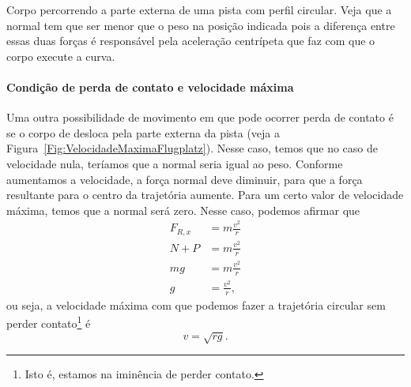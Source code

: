 \begin{marginfigure}
\centering
{}
\caption{Corpo percorrendo a parte externa de uma pista com perfil circular. Veja que a normal tem que ser menor que o peso na posição indicada pois a diferença entre essas duas forças é responsável pela aceleração centrípeta que faz com que o corpo execute a curva.\label{Fig:VelocidadeMaximaFlugplatz}}
\end{marginfigure}

\paragraph{Condição de perda de contato e velocidade máxima}

Uma outra possibilidade de movimento em que pode ocorrer perda de contato é se o corpo de desloca pela parte externa da pista (veja a Figura~\ref{Fig:VelocidadeMaximaFlugplatz}). Nesse caso, temos que no caso de velocidade nula, teríamos que a normal seria igual ao peso. Conforme aumentamos a velocidade, a força normal deve diminuir, para que a força resultante para o centro da trajetória aumente. Para um certo valor de velocidade máxima, temos que a normal será zero. Nesse caso, podemos afirmar que
\begin{align}
    F_{R,x} &= m \frac{v^2}{r} \\
    N + P &= m \frac{v^2}{r} \\
    mg &= m \frac{v^2}{r} \\
    g &= \frac{v^2}{r},
\end{align}
%
ou seja, a velocidade máxima com que podemos fazer a trajetória circular sem perder contato\footnote[][-2cm]{Isto é, estamos na iminência de perder contato.} é
\begin{equation}
    v = \sqrt{rg}.
\end{equation}

